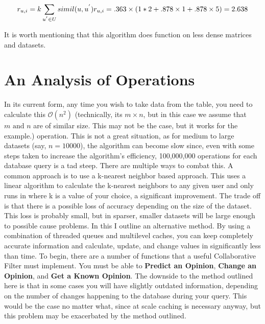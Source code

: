 \documentclass[12pt]{article}
\begin{document}
  \begin{displaymath}
    r_{u,i} = k \sum_{u^{'} \in U} simil(u, u^{'}) r_{u, i} = .363 \times (1 * 2 + .878 \times 1 + .878 \times 5) = 2.638
  \end{displaymath}

  \indent It is worth mentioning that this algorithm does function on less dense matrices and datasets.  

  \pagebreak
  \section{An Analysis of Operations}
  \indent In its current form, any time you wish to take data from the table, you need to calculate this $\mathcal{O}(n^2)$ (technically, its $m \times n$, but in this case we assume that $m \text{ and } n$ are of similar size.  This may not be the case, but it works for the example.) operation.  This is not a great situation, as for medium to large datasets (say, $n = 10000$), the algorithm can become slow since, even with some steps taken to increase the algorithm's efficiency, 100,000,000 operations for each database query is a tad steep.  
  \p There are multiple ways to combat this.  A common approach is to use a k-nearest neighbor based approach.  This uses a linear algorithm to calculate the k-nearest neighbors to any given user and only runs in  where k is a value of your choice, a significant improvement.  The trade off is that there is a possible loss of accuracy depending on the size of the dataset.  This loss is probably small, but in sparser, smaller datasets will be large enough to possible cause problems.
  \p In this I outline an alternative method.  By using a combination of threaded queues and multilevel caches, you can keep completely accurate information and calculate, update, and change values in significantly less than  time.  To begin, there are a number of functions that a useful Collaborative Filter must implement.  You must be able to \textbf{Predict an Opinion}, \textbf{Change an Opinion}, and \textbf{Get a Known Opinion}.  
  \p The downside to the method outlined here is that in some cases you will have slightly outdated information, depending on the number of changes happening to the database during your query.  This would be the case no matter what, since at scale caching is necessary anyway, but this problem may be exacerbated by the method outlined.
\end{document}
